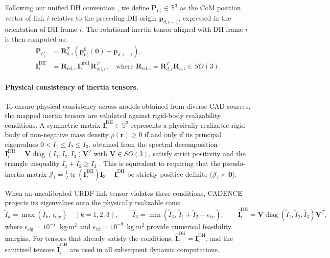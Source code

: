 \documentclass[fleqn,10pt]{article}
\begin{document}
	Following our unified DH convention \cite{ihab2026urdf2dt, asr2026calibration}, we define $\bm{P}_{C_i} \in \mathbb{R}^3$ as the CoM position vector of link $i$ relative to the preceding DH origin $\bm{p}_{d,i-1}$, expressed in the orientation of DH frame $i$. The rotational inertia tensor aligned with DH frame $i$ is then computed as:
	\begin{align}
		\bm{P}_{C_i} &= \bm{R}_{d,i}^T \left( \bm{p}_{C_i}^0(\bm{0}) - \bm{p}_{d,i-1} \right), \label{eq:com_dh_map} \\
		\bm{I}_i^{\text{DH}} &= \bm{R}_{\text{rel},i} \, \bm{I}_i^{\text{urdf}} \, \bm{R}_{\text{rel},i}^T, \quad \text{where } \bm{R}_{\text{rel},i} = \bm{R}_{d,i}^T \bm{R}_{u,i} \in SO(3). \label{eq:inertia_dh_map}
	\end{align}
	\paragraph{Physical consistency of inertia tensors.}
	To ensure physical consistency across models obtained from diverse CAD sources, the mapped inertia tensors are validated against rigid-body realizability conditions. A symmetric matrix $\bm{I}_i^{\text{DH}} \in \mathbb{S}^3$ represents a physically realizable rigid body of non-negative mass density $\rho(\bm{r}) \ge 0$ if and only if its principal eigenvalues $0 < I_1 \le I_2 \le I_3$, obtained from the spectral decomposition $\bm{I}_i^{\text{DH}} = \bm{V}\operatorname{diag}(I_1, I_2, I_3)\bm{V}^T$ with $\bm{V} \in SO(3)$, satisfy strict positivity and the triangle inequality $I_1 + I_2 \ge I_3$ \cite{sousa2019physical, wensing2018linear, lee2020geometric}. This is equivalent to requiring that the pseudo-inertia matrix $\bm{\mathcal{J}}_i = \frac{1}{2}\operatorname{tr}(\bm{I}_i^{\text{DH}})\bm{I}_3 - \bm{I}_i^{\text{DH}}$ be strictly positive-definite ($\bm{\mathcal{J}}_i \succ \bm{0}$).
	
	When an uncalibrated URDF link tensor violates these conditions, CADENCE projects its eigenvalues onto the physically realizable cone:
	\begin{equation}
		\tilde{I}_k = \max(I_k, \, \epsilon_{\text{eig}}) \quad (k=1,2,3), \qquad 
		\hat{I}_3 = \min\!\left(\tilde{I}_3, \, \tilde{I}_1 + \tilde{I}_2 - \epsilon_{\text{tri}}\right), \qquad 
		\hat{\bm{I}}_i^{\text{DH}} = \bm{V}\operatorname{diag}(\tilde{I}_1, \tilde{I}_2, \hat{I}_3)\bm{V}^T,
		\label{eq:spectral_sanitization}
	\end{equation}
	where $\epsilon_{\text{eig}} = 10^{-7}$~kg$\cdot$m$^2$ and $\epsilon_{\text{tri}} = 10^{-9}$~kg$\cdot$m$^2$ provide numerical feasibility margins. For tensors that already satisfy the conditions, $\hat{\bm{I}}_i^{\text{DH}} = \bm{I}_i^{\text{DH}}$, and the sanitized tensors $\hat{\bm{I}}_i^{\text{DH}}$ are used in all subsequent dynamic computations.
	
\end{document}
